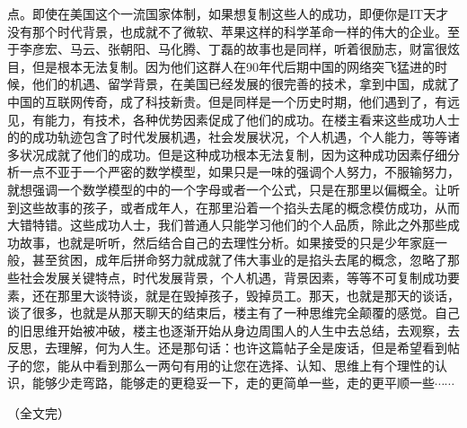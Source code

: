点。即使在美国这个一流国家体制，如果想复制这些人的成功，即便你是IT天才没有那个时代背景，也成就不了微软、苹果这样的科学革命一样的伟大的企业。至于李彦宏、马云、张朝阳、马化腾、丁磊的故事也是同样，听着很励志，财富很炫目，但是根本无法复制。因为他们这群人在90年代后期中国的网络突飞猛进的时候，他们的机遇、留学背景，在美国已经发展的很完善的技术，拿到中国，成就了中国的互联网传奇，成了科技新贵。但是同样是一个历史时期，他们遇到了，有远见，有能力，有技术，各种优势因素促成了他们的成功。在楼主看来这些成功人士的的成功轨迹包含了时代发展机遇，社会发展状况，个人机遇，个人能力，等等诸多状况成就了他们的成功。但是这种成功根本无法复制，因为这种成功因素仔细分析一点不亚于一个严密的数学模型，如果只是一味的强调个人努力，不服输努力，就想强调一个数学模型的中的一个字母或者一个公式，只是在那里以偏概全。让听到这些故事的孩子，或者成年人，在那里沿着一个掐头去尾的概念模仿成功，从而大错特错。这些成功人士，我们普通人只能学习他们的个人品质，除此之外那些成功故事，也就是听听，然后结合自己的去理性分析。如果接受的只是少年家庭一般，甚至贫困，成年后拼命努力就成就了伟大事业的是掐头去尾的概念，忽略了那些社会发展关键特点，时代发展背景，个人机遇，背景因素，等等不可复制成功要素，还在那里大谈特谈，就是在毁掉孩子，毁掉员工。那天，也就是那天的谈话，谈了很多，也就是从那天聊天的结束后，楼主有了一种思维完全颠覆的感觉。自己的旧思维开始被冲破，楼主也逐渐开始从身边周围人的人生中去总结，去观察，去反思，去理解，何为人生。还是那句话：也许这篇帖子全是废话，但是希望看到帖子的您，能从中看到那么一两句有用的让您在选择、认知、思维上有个理性的认识，能够少走弯路，能够走的更稳妥一下，走的更简单一些，走的更平顺一些$\cdots\cdots$

\begin{flushright}
（全文完）
\end{flushright}




\clearpage
